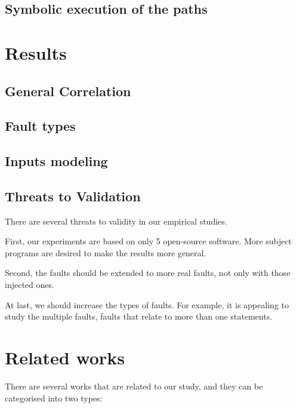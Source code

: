\documentclass{sig-alternate-05-2015}
\begin{document}
\subsection{Symbolic execution of the paths}



\section{Results}\label{sec:results}

\subsection{General Correlation}

\subsection{Fault types}

\subsection{Inputs modeling }


\subsection{Threats to Validation}

There are several threats to validity in our empirical studies. 

First, our experiments are based on only 5 open-source software. More subject programs are desired to make the results more general. 

Second, the faults should be extended to more real faults, not only with those injected ones.

At last, we should increase the types of faults. For example, it is appealing to study the multiple faults, faults that relate to more than one statements.

\section{Related works}\label{sec:related}

There are several works that are related to our study, and they can be categorised into two types:
\end{document}
